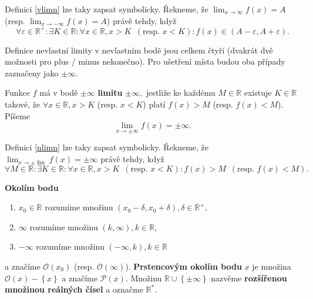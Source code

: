 \begin{pozn}
Definici \ref{vlimn} lze taky zapsat symbolicky. Řekneme, že
$\lim_{x\to \infty} f(x) =A$ (resp. $\lim_{x\to -\infty} f(x) =A$) právě tehdy, když
$$
\forall \varepsilon \in \mathbb R^+:
    \exists K \in \mathbb R: \forall x \in \mathbb R, x > K \,\,\, (\textrm{resp. } x< K):
    f(x) \in \left ( A-\varepsilon, A+\varepsilon \right ).
$$
\end{pozn}

\begin{pozn}
    Definice nevlastní limity v nevlastním bodě jsou celkem čtyři (dvakrát
    dvě možnosti pro plus / minus nekonečno).
    Pro ušetření místa budou oba případy zaznačeny jako $\pm \infty$.
\end{pozn}

\begin{definition}\label{nlimn}
    Funkce $f$ má v bodě $\pm \infty$ \textbf{limitu} $\pm \infty,$
    jestliže ke každému $M \in \mathbb R$ existuje
    $K \in \mathbb R$ takové, že $\forall x \in
    \mathbb R, x> K $ (resp. $x<K$) platí $f(x)>M$ (resp. $f(x) <M$). Píšeme
    $$\lim_{x\to \pm\infty}f(x)=\pm \infty.$$
\end{definition}

\begin{pozn}
    Definici \ref{nlimn} lze taky zapsat symbolicky. Řekneme, že
    $\lim_{x\to \pm\lim} f(x) =\pm\infty$ právě tehdy, když
    $$
    \forall M \in \mathbb R:
        \exists K \in \mathbb R: \forall x \in \mathbb R, x>K\,\,\, (\textrm{resp. }x<K):
        f(x) > M \,\,\, (\textrm{resp. } f(x)<M).
    $$
\end{pozn}

\begin{definition}
\textbf{Okolím bodu}
\begin{enumerate}[$i.$]
\item $x_0\in \mathbb R$ rozumíme množinu $(x_0-\delta,x_0+\delta), \delta \in \mathbb R^+,$
\item $\infty$ rozumíme množinu $(k,\infty), k\in \mathbb R,$
\item $-\infty$ rozumíme množinu $(-\infty,k), k\in \mathbb R$
\end{enumerate}
a značíme $\mathscr O(x_0)$ (resp. $\mathscr O(\infty)$). \textbf{Prstencovým okolím
bodu} $x$ je množina $\mathscr O(x)-\left \{ x \right \} $ a značíme $\mathscr P(x).$
Množinu $\mathbb R \cup \left \{ \pm \infty \right \} $ nazvěme \textbf{rozšířenou množinou
reálných čísel} a označme $\mathbb R^*.$
\end{definition}

